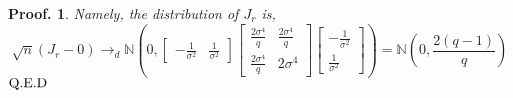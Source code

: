 \documentclass{article}
\theoremstyle{break}
\newtheorem*{proof_break}{Proof.}
\begin{document}
\begin{proof_break}
        \newline
        Namely, the distribution of $J_r$ is,
        $$\sqrt{n}\left(J_{r}-0\right) \rightarrow_{d} \mathbb{N}\left(0,\left[\begin{array}{cc}{-\frac{1}{\sigma^{2}}} & {\frac{1}{\sigma^{2}}}\end{array}\right]\left[\begin{array}{cc}{\frac{2\sigma^{4}}{q}} & {\frac{2\sigma^4}{q}} \\ {\frac{2\sigma^{4}}{q}} & {2\sigma^4}\end{array}\right]\left[\begin{array}{c}{-\frac{1}{\sigma^{2}}} \\ {\frac{1}{\sigma^{2}}}\end{array}\right]\right)=\mathbb{N}(0,\frac{2(q-1)}{q})$$
        $\rm{Q.E.D}$
    \end{proof_break}
\end{document}
